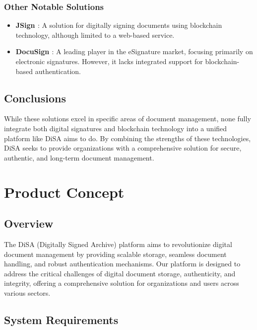 \documentclass[a4paper,11pt]{article}
\begin{document}
        \subsubsection{Other Notable Solutions}
            \begin{itemize}
            \item \textbf{JSign \cite{JSign}}: A solution for digitally signing documents using blockchain technology, although limited to a web-based service.
            
            \item \textbf{DocuSign \cite{DocuSign}}: A leading player in the eSignature market, focusing primarily on electronic signatures. However, it lacks integrated support for blockchain-based authentication.
        \end{itemize}

        \subsection{Conclusions}
            \quad While these solutions excel in specific areas of document management, none fully integrate both digital signatures and blockchain technology into a unified platform like DiSA aims to do. By combining the strengths of these technologies, DiSA seeks to provide organizations with a comprehensive solution for secure, authentic, and long-term document management.

    \clearpage
    \section{Product Concept}\label{sec:productconcept}

        \subsection{Overview}
        \quad The DiSA (Digitally Signed Archive) platform aims to revolutionize digital document management by providing scalable storage, seamless document handling, and robust authentication mechanisms. Our platform is designed to address the critical challenges of digital document storage, authenticity, and integrity, offering a comprehensive solution for organizations and users across various sectors.
        
        \subsection{System Requirements}    
    
\end{document}
